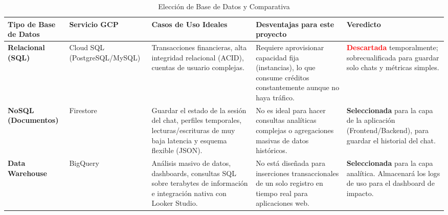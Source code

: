 \documentclass[10pt,a4paper]{article}
\begin{document}
\begin{table}[htbp]
    \centering
    \caption{Elección de Base de Datos y Comparativa}
    \label{tab:comparativa-bases-datos}

    \small
    \renewcommand{\arraystretch}{1.5}

    \begin{tabularx}{\textwidth}{
        p{2.5cm}
        p{3.0cm}
        Y
        Y
        Y
    }

        \toprule

        \textbf{Tipo de Base de Datos} &
        \textbf{Servicio GCP} &
        \textbf{Casos de Uso Ideales} &
        \textbf{Desventajas para este proyecto} &
        \textbf{Veredicto} \\

        \midrule

        \textbf{Relacional (SQL)} &
        Cloud SQL (PostgreSQL/MySQL) &
        Transacciones financieras, alta integridad relacional (ACID), cuentas de usuario complejas. &
        Requiere aprovisionar capacidad fija (instancias), lo que consume créditos constantemente aunque no haya tráfico. &
        \textbf{\textcolor{red}{Descartada}} temporalmente; sobrecualificada para guardar solo chats y métricas simples. \\

        \midrule

        \textbf{NoSQL (Documentos)} &
        Firestore &
        Guardar el estado de la sesión del chat, perfiles temporales, lecturas/escrituras de muy baja latencia y esquema flexible (JSON). &
        No es ideal para hacer consultas analíticas complejas o agregaciones masivas de datos históricos. &
        \textbf{\textcolor{green!50!black}{Seleccionada}} para la capa de la aplicación (Frontend/Backend), para guardar el historial del chat. \\

        \midrule

        \textbf{Data Warehouse} &
        BigQuery &
        Análisis masivo de datos, dashboards, consultas SQL sobre terabytes de información e integración nativa con Looker Studio. &
        No está diseñada para inserciones transaccionales de un solo registro en tiempo real para aplicaciones web. &
        \textbf{\textcolor{green!50!black}{Seleccionada}} para la capa analítica. Almacenará los logs de uso para el dashboard de impacto. \\

        \bottomrule

    \end{tabularx}
\end{table}
\end{document}
